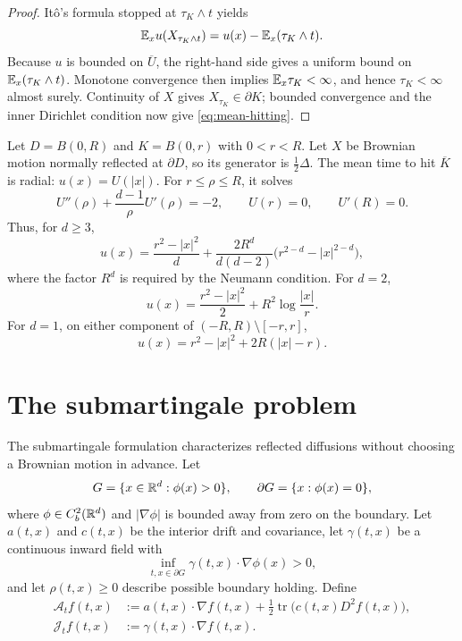 \begin{proof}
It\^o's formula stopped at $\tau_K\wedge t$ yields
\[
  \mathbb E_x u(X_{\tau_K\wedge t})
  =u(x)-\mathbb E_x(\tau_K\wedge t).
\]
Because $u$ is bounded on $\overline U$, the right-hand side gives a uniform
bound on $\mathbb E_x(\tau_K\wedge t)$. Monotone convergence then implies
$\mathbb E_x\tau_K<\infty$, and hence $\tau_K<\infty$ almost surely. Continuity of
$X$ gives $X_{\tau_K}\in\partial K$; bounded convergence and the inner
Dirichlet condition now give \eqref{eq:mean-hitting}.
\end{proof}

\begin{example}
Let $D=B(0,R)$ and $K=B(0,r)$ with $0<r<R$. Let $X$ be Brownian motion
normally reflected at $\partial D$, so its generator is
$\frac12\Delta$. The mean time to hit $\overline K$ is radial:
$u(x)=U(|x|)$. For $r\leq\rho\leq R$, it solves
\[
  U''(\rho)+\frac{d-1}{\rho}U'(\rho)=-2,
  \qquad U(r)=0,
  \qquad U'(R)=0.
\]
Thus, for $d\geq3$,
\begin{equation}
  u(x)
  =\frac{r^2-|x|^2}{d}
   +\frac{2R^d}{d(d-2)}
      \bigl(r^{2-d}-|x|^{2-d}\bigr), \label{eq:annulus-dge3}
\end{equation}
where the factor $R^d$ is required by the Neumann condition. For $d=2$,
\begin{equation}
  u(x)=\frac{r^2-|x|^2}{2}+R^2\log\frac{|x|}{r}. \label{eq:annulus-d2}
\end{equation}
For $d=1$, on either component of $(-R,R)\setminus[-r,r]$,
\[
  u(x)=r^2-|x|^2+2R(|x|-r).
\]
\end{example}

\section{The submartingale problem}

The submartingale formulation characterizes reflected diffusions without
choosing a Brownian motion in advance. Let
\[
  G=\{x\in\mathbb R^d:\phi(x)>0\},
  \qquad
  \partial G=\{x:\phi(x)=0\},
\]
where $\phi\in C_b^2(\mathbb R^d)$ and
$|\nabla\phi|$ is bounded away from zero on the boundary. Let
$a(t,x)$ and $c(t,x)$ be the interior drift and covariance, let
$\gamma(t,x)$ be a continuous inward field with
\[
  \inf_{t,x\in\partial G}
  \gamma(t,x)\cdot\nabla\phi(x)>0,
\]
and let $\rho(t,x)\geq0$ describe possible boundary holding. Define
\begin{align*}
  \mathcal A_t f(t,x)
  &:=a(t,x)\cdot\nabla f(t,x)
    +\frac12\operatorname{tr}
      \bigl(c(t,x)D^2f(t,x)\bigr),\\
  \mathcal J_t f(t,x)&:=\gamma(t,x)\cdot\nabla f(t,x).
\end{align*}

